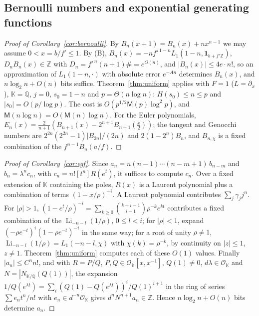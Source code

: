 \documentclass[11pt,reqno]{amsart}
\theoremstyle{definition}
\theoremstyle{remark}
\newcommand{\Li}{\operatorname{Li}}
\newcommand{\QQ}{\mathbb{Q}}
\newcommand{\ZZ}{\mathbb{Z}}
\newcommand{\Mul}{\mathsf{M}}
\begin{document}
\begin{small}
\subsection{Bernoulli numbers and exponential generating functions}\label{app:sequences}
\begin{proof}[Proof of Corollary~\ref{cor:bernoulli}]
By $B_n(x+1) = B_n(x) + nx^{n-1}$ we may assume $0 < x = b/f' \le 1$. By (B), $B_n(x) = -nf'^{\,1-n}L_1(1-n,
\mathbf 1_{b+f'\ZZ})$, $D_nB_n(x) \in \ZZ$ with $D_n = f'^{\,n}(n+1)\# = e^{O(n)}$, and $|B_n(x)| \le 4e\cdot n!$, so an
approximation of $L_1(1-n, \cdot)$ with absolute error $e^{-An}$ determines $B_n(x)$, and $n\log_2n + O(n)$ bits suffice.
Theorem~\ref{thm:uniform} applies with $F = 1$ ($L = \partial_x$), $\mathbb K = \QQ$, $j = 0$, $s_0 = 1 - n$ and
$p = \Theta(n\log n)$: $H(s_0) \le n \le p$ and $|s_0| = O(p/\log p)$. The cost is $O(p^{1/2}\Mul(p)\log^2p)$, and
$\Mul(n\log n) = O(\Mul(n)\log n)$. For the Euler polynomials,
$E_n(x) = \frac2{n+1}(B_{n+1}(x) - 2^{n+1}B_{n+1}(\frac x2))$; the tangent and Genocchi numbers are
$2^{2n}(2^{2n}-1)|B_{2n}|/(2n)$ and $2(1-2^n)B_n$, and $B_{n,\chi}$ is a fixed combination of the $f^{n-1}B_n(a/f)$.
\end{proof}

\begin{proof}[Proof of Corollary~\ref{cor:egf}]
Since $a_n = n(n-1)\cdots(n-m+1)\,b_{n-m}$ and $b_n = \lambda^nc_n$, with $c_n = n![t^n]R(e^t)$, it suffices to compute
$c_n$. Over a fixed extension of $\mathbb K$ containing the poles, $R(x)$ is a Laurent polynomial plus a combination of
terms $(1 - x/\rho)^{-i}$. A Laurent polynomial contributes $\sum_j\gamma_jj^n$. For $|\rho| > 1$,
$(1 - e^t/\rho)^{-i} = \sum_{k\ge0}\binom{k+i-1}{i-1}\rho^{-k}e^{kt}$ contributes a fixed combination of the
$\Li_{-n-l}(1/\rho)$, $0 \le l < i$; for $|\rho| < 1$, expand $(-\rho e^{-t})^i(1 - \rho e^{-t})^{-i}$ in the same way;
for a root of unity $\rho \ne 1$, $\Li_{-n-l}(1/\rho) = L_1(-n-l,\chi)$ with $\chi(k) = \rho^{-k}$, by continuity on
$|z| \le 1$, $z \ne 1$. Theorem~\ref{thm:uniform} computes each of these $O(1)$ values. Finally
$|a_n| \le C^nn!$, and with $R = P/Q$, $P, Q \in \mathcal O_{\mathbb K}[x, x^{-1}]$, $Q(1) \ne 0$, $d\lambda \in \mathcal O_{\mathbb K}$
and $N = |N_{\mathbb K/\QQ}(Q(1))|$, the expansion $1/Q(e^{\lambda t}) = \sum_i(Q(1) - Q(e^{\lambda t}))^i/Q(1)^{i+1}$ in
the ring of series $\sum e_nt^n/n!$ with $e_n \in d^{-n}\mathcal O_{\mathbb K}$ gives $d^nN^{n+1}a_n \in \ZZ$. Hence
$n\log_2n + O(n)$ bits determine $a_n$.
\end{proof}


\end{small}
\end{document}
